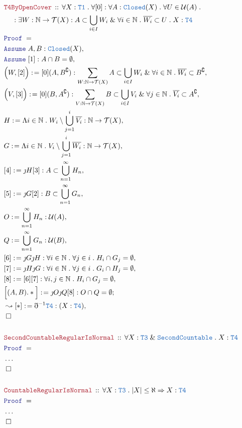 \documentclass[12pt]{scrartcl}
\newcommand{\TYPE}[1]{\textcolor{NavyBlue}{\mathtt{#1}}}
\newcommand{\LOGIC}[1]{\textcolor{Blue}{\mathtt{#1}}}
\newcommand{\THM}[1]{\textcolor{Maroon}{\mathtt{#1}}}
\renewcommand{\.}{\; . \;}
\newcommand{\de}{: \kern 0.1pc =}
\newcommand{\Theorem}[2]{& \THM{#1} \, :: \, #2 \\ & \Proof = \\ }
\newcommand{\NewLine}{\\ & \kern 1pc}
\newcommand{\Page}[1]{ \begin{align*} #1 \end{align*}   }
\newcommand{ \bd }{ \ByDef }
\newcommand{\NoProof}{ & \ldots \\ \EndProof}
\renewcommand{\And}{\; \& \;}
\newcommand{\Imply}{\Rightarrow}
\newcommand{\Nat}{\mathbb{N} }
\renewcommand{\c}{\complement}
\newcommand{\Say}[3]{& #1 \de #2 : #3, \\}
\newcommand{\Conclude}[3]{& #1 \de #2 : #3; \\}
\newcommand{\Derive}[3]{& \leadsto #1 \de #2 : #3, \\}
\newcommand{\Assume}[2]{& \LOGIC{Assume} \; #1 : #2, \\}
\newcommand{\QED}{\; \square}
\newcommand{\EndProof}{& \QED \\}
\newcommand{\ByDef}{\eth}
\newcommand{\ByConstr}{\jmath}
\newcommand{\Proof}{\LOGIC{Proof} \; }
\newcommand{\T}{\mathcal{T}}
\renewcommand{\U}{\mathcal{U}}
\begin{document}
\Page{
	\Theorem{T4ByOpenCover}
	{
		\forall X : \TYPE{T1} \.
		\forall [0] :
		\forall A : \TYPE{Closed}(X) \.
		\forall U \in \U(A) \.
		\NewLine : 
		\exists W : \Nat \to \T(X) : 
		A \subset \bigcup_{i \in I} W_i  \And 
		\forall i \in \Nat \. 
		\overline{W_i} \subset  U \.
		X : \TYPE{T4}
	}
	\Assume{A,B}{\TYPE{Closed}(X)}
	\Assume{[1]}{A \cap B = \emptyset}
	\Say{\Big(W,[2]\Big)}{[0](A,B^\c)}
	{ 
		\sum_{W : \Nat \to \T(X)} 
		A \subset \bigcup_{i \in I} W_i 
		\And
		\forall i \in \Nat \. \overline{W_i} \subset B^\c
	}
	\Say{\Big(V,[3]\Big)}{[0](B,A^\c)}
	{ 
		\sum_{V : \Nat \to \T(X)} 
		B \subset \bigcup_{i \in I} V_i 
		\And
		\forall j \in \Nat \. \overline{V_i} \subset A^\c
	}
	\Say{H}{
		\Lambda i \in \Nat \. W_i \setminus \bigcup_{j=1}^{i} \overline{V_i}  
	}{ \Nat \to \T(X)  }
	\Say{G}{
		\Lambda i \in \Nat \. V_i \setminus \bigcup_{j=1}^{i} \overline{W_i}  
	}{ \Nat \to \T(X)  }
	\Say{[4]}{\ByConstr H [3]}
	{
		A \subset \bigcup^\infty_{n=1} H_n
	}
	\Say{[5]}{\ByConstr G [2]}
	{
		B \subset \bigcup^\infty_{n=1} G_n
	}
	\Say{O}{ \bigcup^\infty_{n=1} H_n }{\U(A)}
	\Say{Q}{\bigcup^\infty_{n=1} G_n}{\U(B)}
	\Say{[6]}{\ByConstr G \ByConstr H}{\forall i \in \Nat \. \forall j \in i \. H_i \cap G_j = \emptyset }
	\Say{[7]}{\ByConstr H \ByConstr G}{\forall i \in \Nat \. \forall j \in i \. G_i \cap H_j = \emptyset }
	\Say{[8]}{ [6][7] }{\forall i,j \in \Nat \. H_i \cap G_j = \emptyset}  
	\Conclude{\Big[(A,B).*\Big]}{ \ByConstr O \ByConstr Q [8]}{ O \cap Q = \emptyset}
	\Derive{[*]}{\bd^{-1}\TYPE{T4} }{ (X : \TYPE{T4}) }
	\EndProof
	\\
	\Theorem{SecondCountableRegularIsNormal}
	{
		\forall X : \TYPE{T3} \And \TYPE{SecondCountable} \. X : \TYPE{T4}
	}
	\NoProof
	\\
	\Theorem{CountableRegularIsNormal}
	{
		\forall X : \TYPE{T3} \. |X| \le  \aleph  \Imply X : \TYPE{T4}
	}
	\NoProof
}
\end{document}
